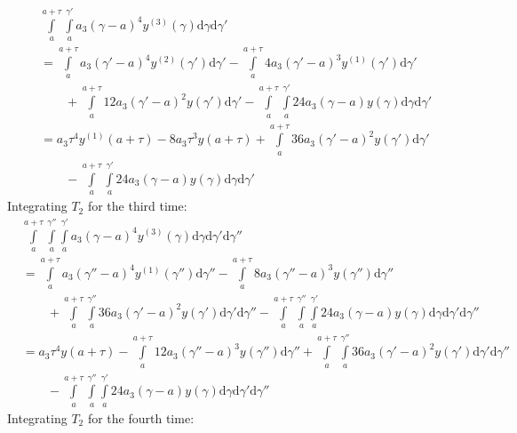 \documentclass{article}
\begin{document}
\begin{equation}
\begin{split}
	&\int\limits_{a}^{a+\tau}\int\limits_{a}^{\gamma'}a_3(\gamma -a)^{4}y^{(3)}(\gamma)\mathrm{d}\gamma\mathrm{d}\gamma'\\
	& = \int\limits_{a}^{a+\tau}a_3(\gamma'-a)^{4}y^{(2)}(\gamma')\mathrm{d}\gamma' - \int\limits_{a}^{a+\tau}4a_3(\gamma' -a)^{3}y^{(1)}(\gamma')\mathrm{d}\gamma' \\&\qquad{}+\int\limits_{a}^{a+\tau}12a_3(\gamma'-a)^{2}y(\gamma')\mathrm{d}\gamma' -\int\limits_{a}^{a+\tau}\int\limits_{a}^{\gamma'}24a_3(\gamma-a)y(\gamma)\mathrm{d}\gamma\mathrm{d}\gamma'\\
	& = a_3\tau^{4}y^{(1)}(a+\tau) - 8a_3\tau^{3}y(a+\tau) + \int\limits_{a}^{a+\tau}36a_3(\gamma'-a)^{2}y(\gamma')\mathrm{d}\gamma'\\ &\qquad{} -\int\limits_{a}^{a+\tau}\int\limits_{a}^{\gamma'}24a_3(\gamma-a)y(\gamma)\mathrm{d}\gamma\mathrm{d}\gamma'
\end{split}
\end{equation}
Integrating $T_2$ for the third time:
\begin{equation}
\begin{split}
	&\int\limits_{a}^{a+\tau}\int\limits_{a}^{\gamma''}\int\limits_{a}^{\gamma'}a_3(\gamma -a)^{4}y^{(3)}(\gamma)\mathrm{d}\gamma\mathrm{d}\gamma'\mathrm{d}\gamma''\\
	& = \int\limits_{a}^{a+\tau}a_3(\gamma''-a)^{4}y^{(1)}(\gamma'')\mathrm{d}\gamma'' - \int\limits_{a}^{a+\tau}8a_3(\gamma'' -a)^{3}y(\gamma'')\mathrm{d}\gamma''\\&\qquad{} +\int\limits_{a}^{a+\tau}\int\limits_{a}^{\gamma''}36a_3(\gamma'-a)^{2}y(\gamma')\mathrm{d}\gamma'\mathrm{d}\gamma'' -\int\limits_{a}^{a+\tau}\int\limits_{a}^{\gamma''}\int\limits_{a}^{\gamma'}24a_3(\gamma-a)y(\gamma)\mathrm{d}\gamma\mathrm{d}\gamma'\mathrm{d}\gamma''\\
	& = a_3\tau^{4}y(a+\tau) - \int\limits_{a}^{a+\tau}12a_3(\gamma''-a)^{3}y(\gamma'')\mathrm{d}\gamma'' + \int\limits_{a}^{a+\tau}\int\limits_{a}^{\gamma''}36a_3(\gamma'-a)^{2}y(\gamma')\mathrm{d}\gamma'\mathrm{d}\gamma''\\ 
	&\qquad{}-\int\limits_{a}^{a+\tau}\int\limits_{a}^{\gamma''}\int\limits_{a}^{\gamma'}24a_3(\gamma-a)y(\gamma)\mathrm{d}\gamma\mathrm{d}\gamma'\mathrm{d}\gamma''
\end{split}
\end{equation}
Integrating $T_2$ for the fourth time:
\end{document}
